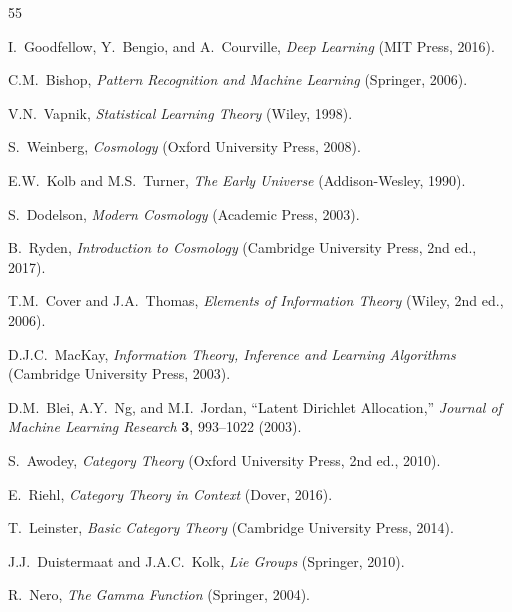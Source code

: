 \documentclass[aps,prd,preprint,superscriptaddress,showpacs,nofootinbib,longbibliography]{revtex4-2}
\begin{document}
\begin{thebibliography}{55}

I.~Goodfellow, Y.~Bengio, and A.~Courville,
\textit{Deep Learning} (MIT Press, 2016).

C.M.~Bishop,
\textit{Pattern Recognition and Machine Learning} (Springer, 2006).

V.N.~Vapnik,
\textit{Statistical Learning Theory} (Wiley, 1998).


S.~Weinberg,
\textit{Cosmology} (Oxford University Press, 2008).

E.W.~Kolb and M.S.~Turner,
\textit{The Early Universe} (Addison-Wesley, 1990).

S.~Dodelson,
\textit{Modern Cosmology} (Academic Press, 2003).

B.~Ryden,
\textit{Introduction to Cosmology} (Cambridge University Press, 2nd ed., 2017).


T.M.~Cover and J.A.~Thomas,
\textit{Elements of Information Theory} (Wiley, 2nd ed., 2006).

D.J.C.~MacKay,
\textit{Information Theory, Inference and Learning Algorithms} (Cambridge University Press, 2003).

D.M.~Blei, A.Y.~Ng, and M.I.~Jordan,
``Latent Dirichlet Allocation,''
\textit{Journal of Machine Learning Research} \textbf{3}, 993--1022 (2003).


S.~Awodey,
\textit{Category Theory} (Oxford University Press, 2nd ed., 2010).

E.~Riehl,
\textit{Category Theory in Context} (Dover, 2016).

T.~Leinster,
\textit{Basic Category Theory} (Cambridge University Press, 2014).


J.J.~Duistermaat and J.A.C.~Kolk,
\textit{Lie Groups} (Springer, 2010).

R.~Nero,
\textit{The Gamma Function} (Springer, 2004).



\end{thebibliography}
\end{document}
